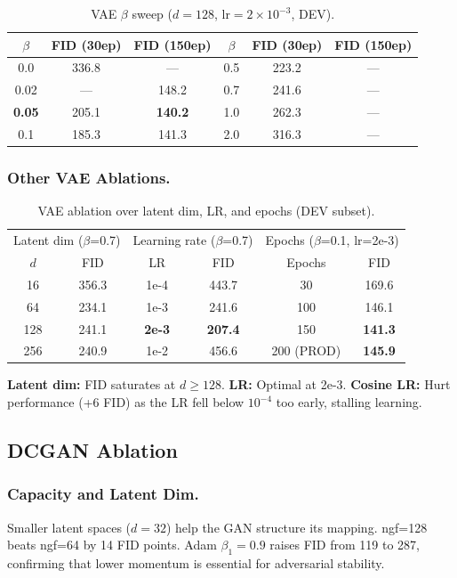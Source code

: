 \documentclass[runningheads]{llncs}
\begin{document}
\begin{table}[htbp]
\caption{VAE $\beta$ sweep ($d=128$, lr$=2{\times}10^{-3}$, DEV).}\label{tab:vae_beta}
\centering\small
\begin{tabular}{ccc|ccc}
\toprule
$\beta$ & FID (30ep) & FID (150ep) & $\beta$ & FID (30ep) & FID (150ep) \\
\midrule
0.0  & 336.8 & --- & 0.5 & 223.2 & --- \\
0.02 & ---   & 148.2 & 0.7 & 241.6 & --- \\
\textbf{0.05} & 205.1 & \textbf{140.2} & 1.0 & 262.3 & --- \\
0.1  & 185.3 & 141.3 & 2.0 & 316.3 & --- \\
\bottomrule
\end{tabular}
\end{table}

\subsubsection{Other VAE Ablations.}
\begin{table}[htbp]
\caption{VAE ablation over latent dim, LR, and epochs (DEV subset).}\label{tab:vae_other}
\centering\small
\begin{tabular}{cc|cc|cc}
\toprule
\multicolumn{2}{c|}{Latent dim ($\beta$=0.7)} & \multicolumn{2}{c|}{Learning rate ($\beta$=0.7)} & \multicolumn{2}{c}{Epochs ($\beta$=0.1, lr=2e-3)} \\
$d$ & FID & LR & FID & Epochs & FID \\
\midrule
16  & 356.3 & 1e-4 & 443.7 & 30  & 169.6 \\
64  & 234.1 & 1e-3 & 241.6 & 100 & 146.1 \\
128 & 241.1 & \textbf{2e-3} & \textbf{207.4} & 150 & \textbf{141.3} \\
256 & 240.9 & 1e-2 & 456.6 & 200 (PROD) & \textbf{145.9} \\
\bottomrule
\end{tabular}
\end{table}
\textbf{Latent dim:} FID saturates at $d \geq 128$. \textbf{LR:} Optimal at 2e-3. \textbf{Cosine LR:} Hurt performance (+6 FID) as the LR fell below $10^{-4}$ too early, stalling learning.

\subsection{DCGAN Ablation}\label{sec:gan_ablation}

\subsubsection{Capacity and Latent Dim.} Smaller latent spaces ($d=32$) help the GAN structure its mapping. ngf=128 beats ngf=64 by 14 FID points. Adam $\beta_1=0.9$ raises FID from 119 to 287, confirming that lower momentum is essential for adversarial stability.
\end{document}
